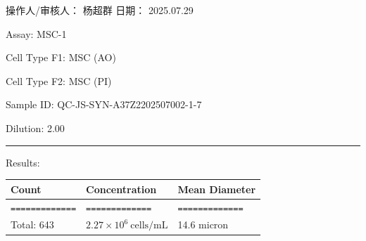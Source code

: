 \documentclass[UTF8,10pt,a4paper,fontset=fandol]{ctexart}
\renewcommand{\arraystretch}{1.15}
\newcommand{\fieldvalue}[1]{#1}
\newcommand{\handwritten}[1]{#1}
\begin{document}
\begin{center}
\begin{center}
\medskip
\noindent
\begin{minipage}[t]{0.48\textwidth}
\centering
\fbox{\rule{0pt}{0.25\textwidth}\rule{0.95\linewidth}{0pt}}
\end{minipage}
\hfill
\begin{minipage}[t]{0.48\textwidth}
\centering
\fbox{\rule{0pt}{0.25\textwidth}\rule{0.95\linewidth}{0pt}}
\end{minipage}

\vfill

\noindent 操作人/审核人：
\fieldvalue{\handwritten{杨超群}}
\hfill
日期：
\fieldvalue{\handwritten{2025.07.29}}

\newpage

Assay: 
\fieldvalue{MSC-1}

\vspace{0.5em}

Cell Type F1: 
\fieldvalue{MSC (AO)}

Cell Type F2: 
\fieldvalue{MSC (PI)}

\vspace{0.5em}

Sample ID: 
\fieldvalue{QC-JS-SYN-A37Z2202507002-1-7}

Dilution: 
\fieldvalue{2.00}

\vspace{0.5em}
\hrule
\vspace{0.3em}

Results:

\renewcommand{\arraystretch}{1.15}
\begin{tabularx}{\textwidth}{@{}XXX@{}}
\textbf{Count} & \textbf{Concentration} & \textbf{Mean Diameter} \\
\hline
\texttt{=============} & \texttt{=============} & \texttt{=============} \\

\fieldvalue{Total: 643}
&
\fieldvalue{$2.27\times10^{6}\ \mathrm{cells/mL}$}
&
\fieldvalue{14.6 micron}
\\


\end{tabularx}
\end{center}
\end{center}
\end{document}
